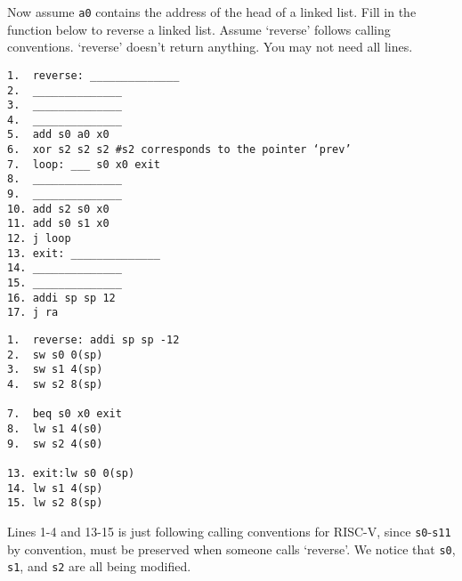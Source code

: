 \begin{blocksection}
\question
Now assume \lstinline$a0$ contains the address of the head of a linked list.  Fill in the function 
below to reverse a linked list. Assume ‘reverse’ follows calling conventions. ‘reverse’ doesn’t return anything. You may not need all lines. 

\begin{verbatim}
1.  reverse: ______________
2.  ______________
3.  ______________
4.  ______________
5.  add s0 a0 x0 
6.  xor s2 s2 s2 #s2 corresponds to the pointer ‘prev’ 
7.  loop: ___ s0 x0 exit
8.  ______________
9.  ______________
10. add s2 s0 x0 
11. add s0 s1 x0 
12. j loop 
13. exit: ______________
14. ______________
15. ______________
16. addi sp sp 12
17. j ra
\end{verbatim}

\begin{solution}[4in]
\begin{verbatim}
1.  reverse: addi sp sp -12
2.  sw s0 0(sp) 
3.  sw s1 4(sp) 
4.  sw s2 8(sp) 

7.  beq s0 x0 exit
8.  lw s1 4(s0)
9.  sw s2 4(s0)

13. exit:lw s0 0(sp)
14. lw s1 4(sp)
15. lw s2 8(sp)
\end{verbatim}

Lines 1-4 and 13-15 is just following calling conventions for RISC-V, since \lstinline$s0$-\lstinline$s11$ by convention, must be preserved when someone calls ‘reverse’. We notice that \lstinline$s0$, \lstinline$s1$, and \lstinline$s2$ are all being modified.

\end{solution}
\end{blocksection}